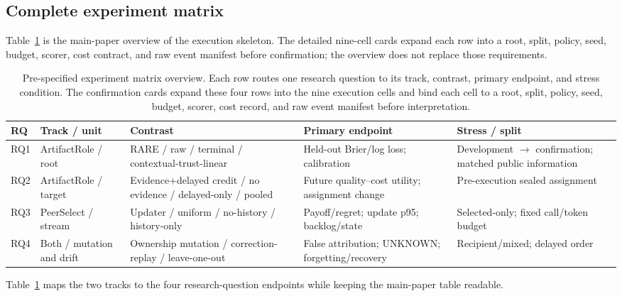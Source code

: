 \documentclass[sigconf,anonymous]{aamas}
\begin{document}
\subsection{Complete experiment matrix}
Table~\ref{tab:matrix} is the main-paper overview of the execution skeleton. The
detailed nine-cell cards expand each row into a root, split, policy, seed, budget,
scorer, cost contract, and raw event manifest before confirmation; the overview
does not replace those requirements.
\begin{table}[t]
\centering\small
\setlength{\tabcolsep}{3pt}
\renewcommand{\arraystretch}{1.08}
\begin{tabular}{p{}p{}p{}p{}p{}}
\toprule
RQ & Track / unit & Contrast & Primary endpoint & Stress / split\\
\midrule
RQ1 & ArtifactRole / root & RARE / raw / terminal / contextual-trust-linear & Held-out Brier/log loss; calibration & Development $\rightarrow$ confirmation; matched public information\\
RQ2 & ArtifactRole / target & Evidence+delayed credit / no evidence / delayed-only / pooled & Future quality--cost utility; assignment change & Pre-execution sealed assignment\\
RQ3 & PeerSelect / stream & Updater / uniform / no-history / history-only & Payoff/regret; update p95; backlog/state & Selected-only; fixed call/token budget\\
RQ4 & Both / mutation and drift & Ownership mutation / correction-replay / leave-one-out & False attribution; UNKNOWN; forgetting/recovery & Recipient/mixed; delayed order\\
\bottomrule
\end{tabular}
\caption{Pre-specified experiment matrix overview. Each row routes one research question to its track, contrast, primary endpoint, and stress condition. The confirmation cards expand these four rows into the nine execution cells and bind each cell to a root, split, policy, seed, budget, scorer, cost record, and raw event manifest before interpretation.}
\label{tab:matrix}
\end{table}

Table~\ref{tab:matrix} maps the two tracks to the four research-question endpoints while keeping the main-paper table readable.
\end{document}
